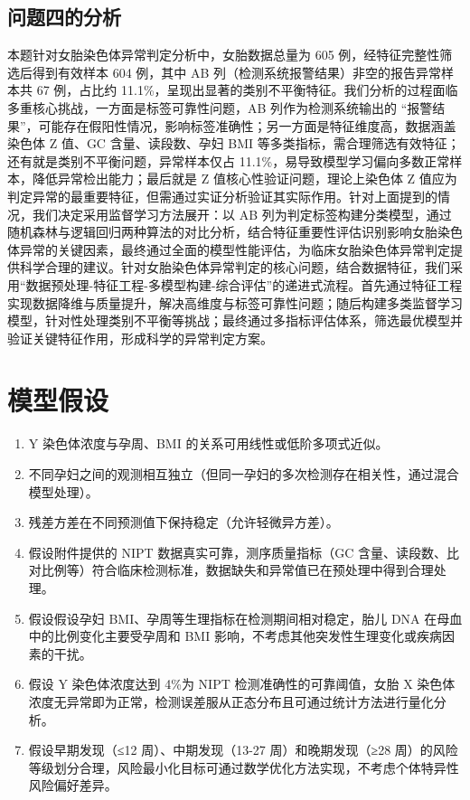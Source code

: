 \documentclass[withoutpreface,bwprint]{cumcmthesis} %
\begin{document}
\subsection{问题四的分析}
本题针对女胎染色体异常判定分析中，女胎数据总量为 605 例，经特征完整性筛选后得到有效样本 604 例，其中 AB 列（检测系统报警结果）非空的报告异常样本共 67 例，占比约 11.1\%，呈现出显著的类别不平衡特征。我们分析的过程面临多重核心挑战，一方面是标签可靠性问题，AB 列作为检测系统输出的 “报警结果”，可能存在假阳性情况，影响标签准确性；另一方面是特征维度高，数据涵盖染色体 Z 值、GC 含量、读段数、孕妇 BMI 等多类指标，需合理筛选有效特征；还有就是类别不平衡问题，异常样本仅占 11.1\%，易导致模型学习偏向多数正常样本，降低异常检出能力；最后就是 Z 值核心性验证问题，理论上染色体 Z 值应为判定异常的最重要特征，但需通过实证分析验证其实际作用。针对上面提到的情况，我们决定采用监督学习方法展开：以 AB 列为判定标签构建分类模型，通过随机森林与逻辑回归两种算法的对比分析，结合特征重要性评估识别影响女胎染色体异常的关键因素，最终通过全面的模型性能评估，为临床女胎染色体异常判定提供科学合理的建议。针对女胎染色体异常判定的核心问题，结合数据特征，我们采用“数据预处理-特征工程-多模型构建-综合评估”的递进式流程。首先通过特征工程实现数据降维与质量提升，解决高维度与标签可靠性问题；随后构建多类监督学习模型，针对性处理类别不平衡等挑战；最终通过多指标评估体系，筛选最优模型并验证关键特征作用，形成科学的异常判定方案。

\section{模型假设}
\begin{enumerate}
    \item Y 染色体浓度与孕周、BMI 的关系可用线性或低阶多项式近似。
    \item 不同孕妇之间的观测相互独立（但同一孕妇的多次检测存在相关性，通过混合模型处理）。
    \item 残差方差在不同预测值下保持稳定（允许轻微异方差）。
    \item 假设附件提供的 NIPT 数据真实可靠，测序质量指标（GC 含量、读段数、比对比例等）符合临床检测标准，数据缺失和异常值已在预处理中得到合理处理。
    \item 假设假设孕妇 BMI、孕周等生理指标在检测期间相对稳定，胎儿 DNA 在母血中的比例变化主要受孕周和 BMI 影响，不考虑其他突发性生理变化或疾病因素的干扰。
    \item 假设 Y 染色体浓度达到 4\%为 NIPT 检测准确性的可靠阈值，女胎 X 染色体浓度无异常即为正常，检测误差服从正态分布且可通过统计方法进行量化分析。
    \item 假设早期发现（≤12 周）、中期发现（13-27 周）和晚期发现（≥28 周）的风险等级划分合理，风险最小化目标可通过数学优化方法实现，不考虑个体特异性风险偏好差异。
\end{enumerate}
\end{document}
